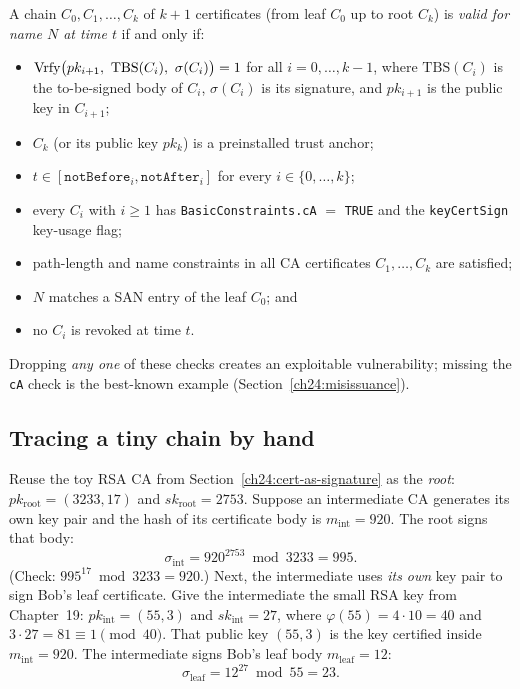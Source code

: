 \begin{formalbox}
A chain $C_0, C_1, \dots, C_k$ of $k+1$ certificates (from leaf $C_0$ up to root $C_k$) is \emph{valid for name $N$ at time $t$} if and only if:
\begin{itemize}
\item $\Vrfy\bigl(pk_{i+1},\ \mathrm{TBS}(C_i),\ \sigma(C_i)\bigr) = 1$ for all $i = 0,\dots,k-1$, where $\mathrm{TBS}(C_i)$ is the to-be-signed body of $C_i$, $\sigma(C_i)$ is its signature, and $pk_{i+1}$ is the public key in $C_{i+1}$;
\item $C_k$ (or its public key $pk_k$) is a preinstalled trust anchor;
\item $t \in [\texttt{notBefore}_i, \texttt{notAfter}_i]$ for every $i \in \{0,\dots,k\}$;
\item every $C_i$ with $i \ge 1$ has \texttt{BasicConstraints.cA} $=$ \texttt{TRUE} and the \texttt{keyCertSign} key-usage flag;
\item path-length and name constraints in all CA certificates $C_1,\dots,C_k$ are satisfied;
\item $N$ matches a SAN entry of the leaf $C_0$; and
\item no $C_i$ is revoked at time $t$.
\end{itemize}
Dropping \emph{any one} of these checks creates an exploitable vulnerability; missing the \texttt{cA} check is the best-known example (Section~\ref{ch24:misissuance}).
\end{formalbox}

\subsection{Tracing a tiny chain by hand}

Reuse the toy RSA CA from Section~\ref{ch24:cert-as-signature} as the \emph{root}: $pk_{\mathrm{root}} = (3233, 17)$ and $sk_{\mathrm{root}} = 2753$. Suppose an intermediate CA generates its own key pair and the hash of its certificate body is $m_{\mathrm{int}} = 920$. The root signs that body:
\[
\sigma_{\mathrm{int}} = 920^{2753} \bmod 3233 = 995.
\]
(Check: $995^{17} \bmod 3233 = 920$.) Next, the intermediate uses \emph{its own} key pair to sign Bob's leaf certificate. Give the intermediate the small RSA key from Chapter~19: $pk_{\mathrm{int}} = (55, 3)$ and $sk_{\mathrm{int}} = 27$, where $\varphi(55) = 4 \cdot 10 = 40$ and $3 \cdot 27 = 81 \equiv 1 \pmod{40}$. That public key $(55, 3)$ is the key certified inside $m_{\mathrm{int}} = 920$. The intermediate signs Bob's leaf body $m_{\mathrm{leaf}} = 12$:
\[
\sigma_{\mathrm{leaf}} = 12^{27} \bmod 55 = 23.
\]

